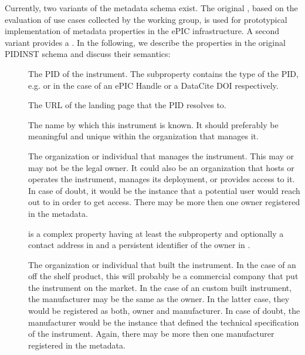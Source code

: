 \documentclass[a4paper,10pt,english]{sphinxmanual}
\begin{document}
Currently, two variants of the metadata schema exist.  The original
, based on the evaluation of use cases collected by
the working group, is used for prototypical implementation of metadata
properties in the ePIC infrastructure.  A second variant provides a
.  In the following, we
describe the properties in the original PIDINST schema and discuss
their semantics:
\begin{description}
\item[{}] \leavevmode
The PID of the instrument.  The subproperty
 contains the type of the PID, e.g.  or
 in the case of an ePIC Handle or a DataCite DOI respectively.

\item[{}] \leavevmode
The URL of the landing page that the PID resolves to.

\item[{}] \leavevmode
The name by which this instrument is known.  It should preferably be
meaningful and unique within the organization that manages it.

\item[{}] \leavevmode
The organization or individual that manages the instrument.  This
may or may not be the legal owner.  It could also be an organization
that hosts or operates the instrument, manages its deployment, or
provides access to it.  In case of doubt, it would be the instance
that a potential user would reach out to in order to get access.
There may be more then one owner registered in the metadata.

 is a complex property having at least the subproperty
 and optionally a contact address in  and a
persistent identifier of the owner in .

\item[{}] \leavevmode
The organization or individual that built the instrument.  In the
case of an off the shelf product, this will probably be a commercial
company that put the instrument on the market.  In the case of an
custom built instrument, the manufacturer may be the same as the
owner.  In the latter case, they would be registered as both, owner
and manufacturer.  In case of doubt, the manufacturer would be the
instance that defined the technical specification of the instrument.
Again, there may be more then one manufacturer registered in the
metadata.


\end{description}
\end{document}
